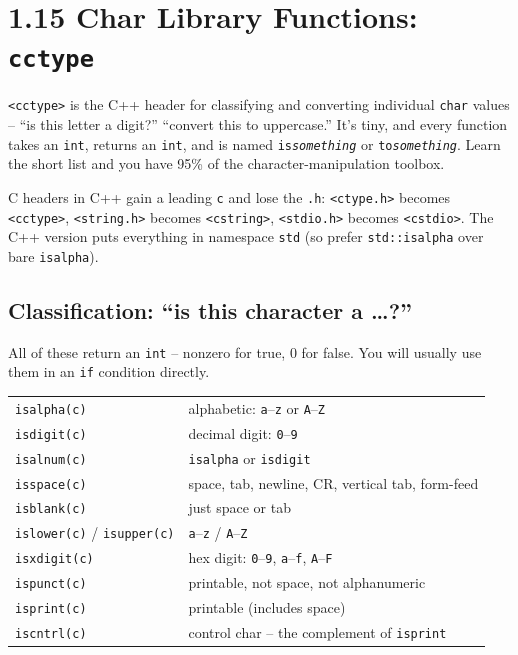 \documentclass[11pt]{article}
\begin{document}
\section{1.15 Char Library Functions: \texttt{cctype}}

\texttt{<cctype>} is the C++ header for classifying and converting
individual \texttt{char} values -- ``is this letter a digit?'' ``convert
this to uppercase.'' It's tiny, and every function takes an
\texttt{int}, returns an \texttt{int}, and is named
\texttt{is\textit{something}} or \texttt{to\textit{something}}. Learn
the short list and you have 95\% of the character-manipulation toolbox.

\begin{defnbox}
C headers in C++ gain a leading \texttt{c} and lose the \texttt{.h}:
\texttt{<ctype.h>} becomes \texttt{<cctype>},
\texttt{<string.h>} becomes \texttt{<cstring>},
\texttt{<stdio.h>} becomes \texttt{<cstdio>}. The C++ version puts
everything in namespace \texttt{std} (so prefer \texttt{std::isalpha}
over bare \texttt{isalpha}).
\end{defnbox}

\subsection{Classification: ``is this character a \ldots?''}

All of these return an \texttt{int} -- nonzero for true, 0 for false.
You will usually use them in an \texttt{if} condition directly.

\begin{center}
\small
\begin{tabular}{ll}
\texttt{isalpha(c)} & alphabetic: \texttt{a}--\texttt{z} or \texttt{A}--\texttt{Z} \\
\texttt{isdigit(c)} & decimal digit: \texttt{0}--\texttt{9} \\
\texttt{isalnum(c)} & \texttt{isalpha} or \texttt{isdigit} \\
\texttt{isspace(c)} & space, tab, newline, CR, vertical tab, form-feed \\
\texttt{isblank(c)} & just space or tab \\
\texttt{islower(c)} / \texttt{isupper(c)} & \texttt{a}--\texttt{z} / \texttt{A}--\texttt{Z} \\
\texttt{isxdigit(c)} & hex digit: \texttt{0}--\texttt{9}, \texttt{a}--\texttt{f}, \texttt{A}--\texttt{F} \\
\texttt{ispunct(c)} & printable, not space, not alphanumeric \\
\texttt{isprint(c)} & printable (includes space) \\
\texttt{iscntrl(c)} & control char -- the complement of \texttt{isprint} \\
\end{tabular}
\normalsize
\end{center}
\end{document}
